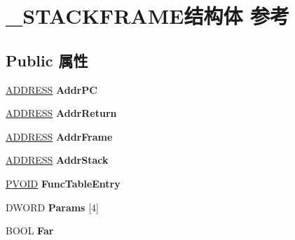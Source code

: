 \hypertarget{struct___s_t_a_c_k_f_r_a_m_e}{}\section{\+\_\+\+S\+T\+A\+C\+K\+F\+R\+A\+M\+E结构体 参考}
\label{struct___s_t_a_c_k_f_r_a_m_e}
\subsection*{Public 属性}
\begin{DoxyCompactItemize}
\item 
\mbox{\label{struct___s_t_a_c_k_f_r_a_m_e_a6f004304b264cf6c502e813f527ffd59}} 
\hyperlink{struct__tag_a_d_d_r_e_s_s}{A\+D\+D\+R\+E\+SS} {\bfseries Addr\+PC}
\item 
\mbox{\label{struct___s_t_a_c_k_f_r_a_m_e_a2e026d666791af17efbd609f7839627e}} 
\hyperlink{struct__tag_a_d_d_r_e_s_s}{A\+D\+D\+R\+E\+SS} {\bfseries Addr\+Return}
\item 
\mbox{\label{struct___s_t_a_c_k_f_r_a_m_e_ab68da165da9fc04bc199014e6c74c430}} 
\hyperlink{struct__tag_a_d_d_r_e_s_s}{A\+D\+D\+R\+E\+SS} {\bfseries Addr\+Frame}
\item 
\mbox{\label{struct___s_t_a_c_k_f_r_a_m_e_af2e6a52537c42027d4854772db223914}} 
\hyperlink{struct__tag_a_d_d_r_e_s_s}{A\+D\+D\+R\+E\+SS} {\bfseries Addr\+Stack}
\item 
\mbox{\label{struct___s_t_a_c_k_f_r_a_m_e_a3fb52800df743e9c76c0fdd7363e6bf3}} 
\hyperlink{interfacevoid}{P\+V\+O\+ID} {\bfseries Func\+Table\+Entry}
\item 
\mbox{\label{struct___s_t_a_c_k_f_r_a_m_e_a85c0076dbb1fd337daf9229dab009b02}} 
D\+W\+O\+RD {\bfseries Params} \mbox{[}4\mbox{]}
\item 
\mbox{\label{struct___s_t_a_c_k_f_r_a_m_e_a60a64131b87c9002a53fe1ca044e1e1b}} 
B\+O\+OL {\bfseries Far}
\item 
\mbox{\label{struct___s_t_a_c_k_f_r_a_m_e_a6bee445d370f2e22b07c895e29df5b0c}} 

\end{DoxyCompactItemize}

